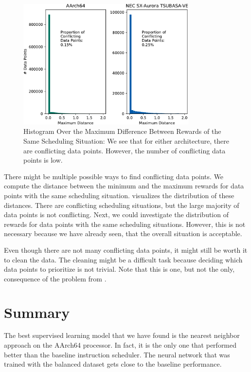\begin{figure}
    \centering
    \includegraphics[width=0.8\textwidth]{img/hist-regr-conflicts-crop.pdf}
    \caption[Histogram Over the Maximum Difference Between Rewards of the Same Scheduling Situation]{Histogram Over the Maximum Difference Between Rewards of the Same Scheduling Situation:
    We see that for either architecture, there are conflicting data points.
    However, the number of conflicting data points is low.}
    \label{fig:eval:hist-conflicting-data-points}
\end{figure}
There might be multiple possible ways to find conflicting data points.
We compute the distance between the minimum and the maximum rewards for data points with the same scheduling situation.
 visualizes the distribution of these distances.
There are conflicting scheduling situations, but the large majority of data points is not conflicting.
Next, we could investigate the distribution of rewards for data points with the same scheduling situations.
However, this is not necessary because we have already seen, that the overall situation is acceptable.

Even though there are not many conflicting data points, it might still be worth it to clean the data.
The cleaning might be a difficult task because deciding which data points to prioritize is not trivial.
Note that this is one, but not the only, consequence of the problem from .


\section{Summary}
The best supervised learning model that we have found is the nearest neighbor approach on the AArch64 processor.
In fact, it is the only one that performed better than the baseline instruction scheduler.
The neural network that was trained with the balanced dataset gets close to the baseline performance.

